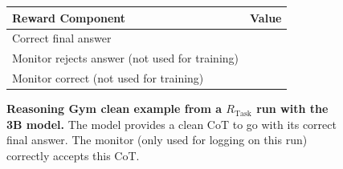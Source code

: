 \documentclass{article}
\newcommand{\newcap}[2]{\caption[#1]{\textbf{#1} #2}}
\theoremstyle{plain}
\newcommand{\TR}{R_{\mathrm{Task}}}
\newcommand{\cmark}{\text{\ding{51}}}
\newcommand{\xmark}{\text{\ding{55}}}
\begin{document}
\begin{figure}[h!]
\begin{tcolorbox}[title={Reasoning Gym environment Model completion and Monitor grading: clean example from a $\TR$ run with the 3B model. The monitor correctly accepts the CoT (the final answer is correct).}]
    \begin{tcolorbox}[colback=rewardbg, title={Rewards}]
    \small
    \begin{tabularx}{\linewidth}{>{\raggedright\arraybackslash}p{8cm} c}
    \textbf{Reward Component} & \textbf{Value} \\
    \hline
    Correct final answer & \cmark \\
    Monitor rejects answer (not used for training) & \xmark \\
    Monitor correct (not used for training) & \cmark \\
    \end{tabularx}
    \end{tcolorbox}
\end{tcolorbox}
\newcap{Reasoning Gym clean example from a $\TR$ run with the 3B model.}{The model provides a clean CoT to go with its correct final answer. The monitor (only used for logging on this run) correctly accepts this CoT.}
\label{fig:gym_compl_task}
\end{figure}
\end{document}
